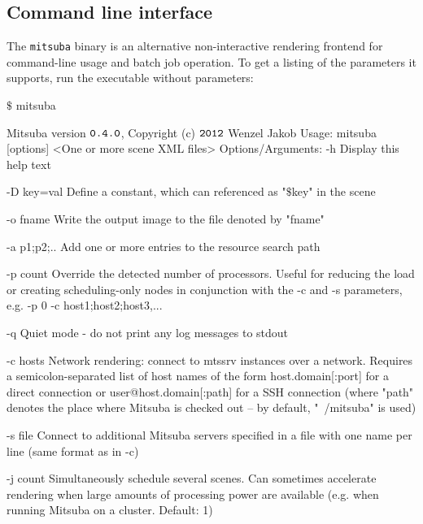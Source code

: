 \subsection{Command line interface}
\label{sec:mitsuba}
The \texttt{mitsuba} binary is an alternative non-interactive rendering 
frontend for command-line usage and batch job operation.
To get a listing of the parameters it supports, run
the executable without parameters:
\begin{shell}
$\texttt{\$}$ mitsuba 
\end{shell}
\begin{console}[label=lst:mitsuba-cli,caption=Command line options of the \texttt{mitsuba} binary]
Mitsuba version $\texttt{0.4.0}$, Copyright (c) $\texttt{2012}$ Wenzel Jakob
Usage: mitsuba [options] <One or more scene XML files>
Options/Arguments:
   -h          Display this help text

   -D key=val  Define a constant, which can referenced as "$\$$key" in the scene

   -o fname    Write the output image to the file denoted by "fname"

   -a p1;p2;.. Add one or more entries to the resource search path

   -p count    Override the detected number of processors. Useful for reducing
               the load or creating scheduling-only nodes in conjunction with
               the -c and -s parameters, e.g. -p 0 -c host1;host2;host3,...

   -q          Quiet mode - do not print any log messages to stdout

   -c hosts    Network rendering: connect to mtssrv instances over a network.
               Requires a semicolon-separated list of host names of the form
                       host.domain[:port] for a direct connection
                 or
                       user@host.domain[:path] for a SSH connection (where
                       "path" denotes the place where Mitsuba is checked
                       out -- by default, "~/mitsuba" is used)

   -s file     Connect to additional Mitsuba servers specified in a file
               with one name per line (same format as in -c)

   -j count    Simultaneously schedule several scenes. Can sometimes accelerate
               rendering when large amounts of processing power are available
               (e.g. when running Mitsuba on a cluster. Default: 1)


\end{console}
